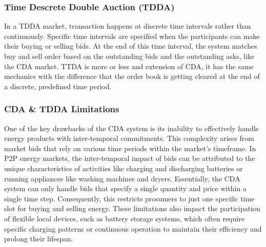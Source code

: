 \subsubsection{Time Descrete Double Auction (TDDA)}

In a TDDA market, transaction happens at discrete time intervals rather than continuously. Specific time intervals are specified when the participants can make their buying or selling
bids. At the end of this time interval, the system matches buy and sell order based on the outstanding bids and the outstanding asks, like the CDA market. TTDA is more or less and
extension of CDA, it has the same mechanics with the difference that the order book is getting cleared at the end of a discrete, predefined time period. \cite{BrooklynMicrogrid}

\subsubsection*{CDA \& TDDA Limitations}
One of the key drawbacks of the CDA system is its inability to effectively handle energy products with inter-temporal commitments. This complexity arises from market bids that
rely on various time periods within the market's timeframe. In P2P energy markets, the inter-temporal impact of bids can be attributed to the unique characteristics of
activities like charging and discharging batteries or running appliances like washing machines and dryers. Essentially, the CDA system can only handle bids that specify a
single quantity and price within a single time step. Consequently, this restricts prosumers to just one specific time slot for buying and selling energy. These limitations also
impact the participation of flexible local devices, such as battery storage systems, which often require specific charging patterns or continuous operation to maintain their
efficiency and prolong their lifespan. \cite{DeTrade}